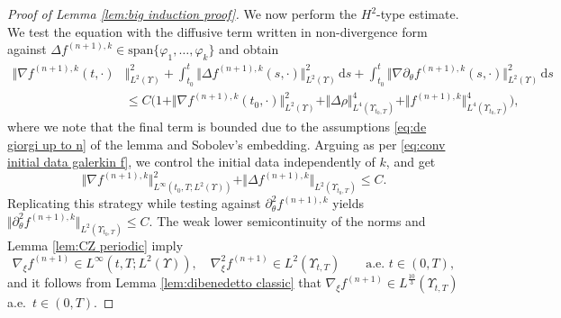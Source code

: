 \documentclass[11pt,a4paper,reqno]{amsart}
\theoremstyle{remark}
\theoremstyle{definition}
\numberwithin{equation}{section}
\renewcommand{\span}{\mathrm{span}}
\newcommand{\bxi}{\xi}
\renewcommand{\d}{\, \mathrm{d} }
\begin{document}
\begin{proof}[Proof of Lemma \ref{lem:big induction proof}]
We now perform the $H^2$-type estimate. We test the equation with the diffusive term written in non-divergence form against $\Delta f^{(n+1),k} \in \span\{\varphi_1,\dots,\varphi_k\}$ and obtain 
\begin{equation*}
   \begin{aligned}
       \Vert \nabla f^{(n+1),k}(t,\cdot) & \Vert^2_{L^2(\Upsilon)} + \int_{t_0}^t \Vert \Delta f^{(n+1),k}(s,\cdot) \Vert^2_{L^2(\Upsilon)} \d s + \int_{t_0}^t \Vert \nabla \partial_\theta f^{(n+1),k}(s,\cdot) \Vert^2_{L^2(\Upsilon)} \d s \\ 
       &\leq C\Big( 1 + \Vert \nabla f^{(n+1),k}(t_0,\cdot)\Vert^2_{L^2(\Upsilon)} + \Vert \Delta \rho \Vert^4_{L^4(\Upsilon_{t_0,T})} + \Vert f^{(n+1),k} \Vert^4_{L^4(\Upsilon_{t_0,T})} \Big), 
   \end{aligned}
\end{equation*}
where we note that the final term is bounded due to the assumptions \eqref{eq:de giorgi up to n} of the lemma and Sobolev's embedding. 
Arguing as per \eqref{eq:conv initial data galerkin f}, we control the initial data independently of $k$, and get 
\begin{equation*}
    \Vert \nabla f^{(n+1),k} \Vert^2_{L^\infty(t_0,T;L^2(\Upsilon))} + \Vert \Delta f^{(n+1),k} \Vert_{L^2(\Upsilon_{t_0,T})} \leq C. 
\end{equation*}
Replicating this strategy while testing against $\partial^2_\theta f^{(n+1),k}$ yields $\Vert \partial^2_\theta f^{(n+1),k}\Vert_{L^2(\Upsilon_{t_0,T})} \leq C$. The weak lower semicontinuity of the norms and Lemma \ref{lem:CZ periodic} imply 
\begin{equation*}
    \nabla_{\bxi} f^{(n+1)} \in L^\infty(t,T;L^2(\Upsilon)), \quad \nabla_{\bxi}^2 f^{(n+1)} \in L^2(\Upsilon_{t,T}) \qquad \text{a.e.~} t \in (0,T), 
\end{equation*}
and it follows from Lemma \ref{lem:dibenedetto classic} that $\nabla_{\bxi}f^{(n+1)} \in L^{\frac{10}{3}}(\Upsilon_{t,T})$ a.e.~$t\in(0,T)$. 



\smallskip 


\end{proof}
\end{document}
